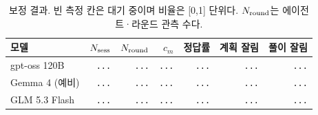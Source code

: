 \begin{table}[H]
\centering\footnotesize
\setlength{\tabcolsep}{4pt}
\caption{보정 결과. 빈 측정 칸은 대기 중이며 비율은 [0,1] 단위다. $N_{\rm round}$는 에이전트·라운드 관측 수다.}
\label{tab:calibration-results}
\begin{tabular}{@{}lrrrrrr@{}}
\toprule
모델 & $N_{\rm sess}$ & $N_{\rm round}$ & $c_m$ & 정답률 & 계획 잘림 & 풀이 잘림 \\
\midrule
gpt-oss 120B & {\color{gray}\texttt{...}} & {\color{gray}\texttt{...}} & {\color{gray}\texttt{...}} & {\color{gray}\texttt{...}} & {\color{gray}\texttt{...}} & {\color{gray}\texttt{...}} \\
Gemma 4 (예비) & {\color{gray}\texttt{...}} & {\color{gray}\texttt{...}} & {\color{gray}\texttt{...}} & {\color{gray}\texttt{...}} & {\color{gray}\texttt{...}} & {\color{gray}\texttt{...}} \\
GLM 5.3 Flash & {\color{gray}\texttt{...}} & {\color{gray}\texttt{...}} & {\color{gray}\texttt{...}} & {\color{gray}\texttt{...}} & {\color{gray}\texttt{...}} & {\color{gray}\texttt{...}} \\
\bottomrule
\end{tabular}
\end{table}
